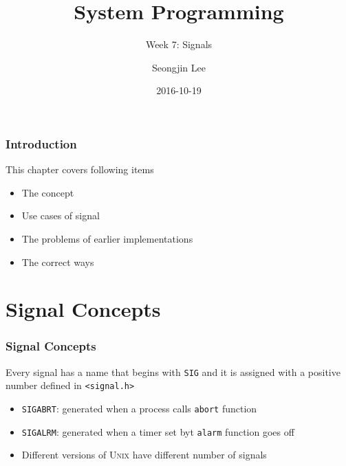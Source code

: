\documentclass[newPxFont,sthlmFooter,nooffset]{beamer}
\title{System Programming}
\subtitle{Week 7: Signals}
\author[SJL]{Seongjin Lee}
\institute{\href{mailto:insight@hanyang.ac.kr}{insight@hanyang.ac.kr}\\\url{http://esos.hanyang.ac.kr}\\Esos Lab. Hanyang University}
\date{2016-10-19}
\begin{document}
\frame[plain]{\titlepage} 






\begin{frame}[t]
  \frametitle{Introduction}
This chapter covers following items
  \begin{itemize}
  \item The concept
  \item Use cases of signal
  \item The problems of earlier implementations
  \item The correct ways
  \end{itemize}

\end{frame}

\section{Signal Concepts}


\begin{frame}[t]
  \frametitle{Signal Concepts}

Every signal has a name that begins with \texttt{SIG} and it is assigned with a positive number defined in \texttt{<signal.h>}
\begin{itemize}
\item \texttt{SIGABRT}: generated when a process calls \texttt{abort} function
\item \texttt{SIGALRM}: generated when a timer set byt \texttt{alarm} function goes off
\item Different versions of \textsc{Unix} have different number of signals
\end{itemize}
\end{frame}
\end{document}
